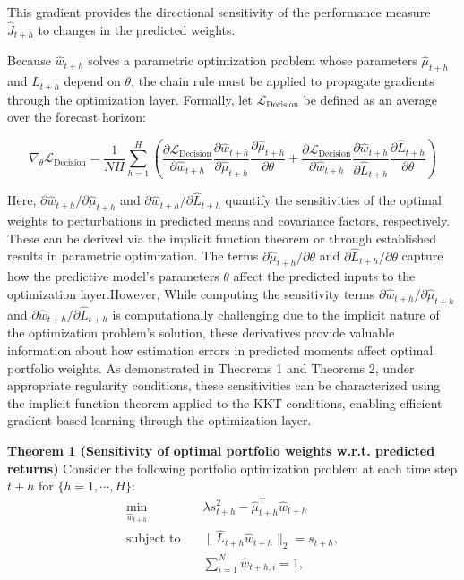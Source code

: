 This gradient provides the directional sensitivity of the performance measure $\hat{J}_{t+h}$ to changes in the predicted weights.

Because $\hat{w}_{t+h}$ solves a parametric optimization problem whose parameters $\hat{\mu}_{t+h}$ and $\hat{L}_{t+h}$ depend on $\theta$, the chain rule must be applied to propagate gradients through the optimization layer. Formally, let $\mathcal{L}_{\mathrm{Decision}}$ be defined as an average over the forecast horizon:

\begin{equation}
    \nabla_{\theta}\mathcal{L}_{\mathrm{Decision}} = \frac{1}{NH}\sum_{h=1}^{H} \left( \frac{\partial \mathcal{L}_{\mathrm{Decision}}}{\partial \hat{w}_{t+h}}\frac{\partial \hat{w}_{t+h}}{\partial \hat{\mu}_{t+h}}\frac{\partial \hat{\mu}_{t+h}}{\partial \theta} + \frac{\partial \mathcal{L}_{\mathrm{Decision}}}{\partial \hat{w}_{t+h}}\frac{\partial \hat{w}_{t+h}}{\partial \hat{L}_{t+h}}\frac{\partial \hat{L}_{t+h}}{\partial \theta}\right)
\end{equation}

Here, $\partial \hat{w}_{t+h}/\partial \hat{\mu}_{t+h}$ and $\partial \hat{w}_{t+h}/\partial \hat{L}_{t+h}$ quantify the sensitivities of the optimal weights to perturbations in predicted means and covariance factors, respectively. These can be derived via the implicit function theorem or through established results in parametric optimization. The terms $\partial \hat{\mu}_{t+h}/\partial \theta$ and $\partial \hat{L}_{t+h}/\partial \theta$ capture how the predictive model’s parameters $\theta$ affect the predicted inputs to the optimization layer.However, While computing the sensitivity terms $\partial \hat{w}_{t+h}/\partial \hat{\mu}_{t+h}$ and $\partial \hat{w}_{t+h}/\partial \hat{L}_{t+h}$ is computationally challenging due to the implicit nature of the optimization problem's solution, these derivatives provide valuable information about how estimation errors in predicted moments affect optimal portfolio weights. As demonstrated in Theorems 1 and Theorems 2, under appropriate regularity conditions, these sensitivities can be characterized using the implicit function theorem applied to the KKT conditions, enabling efficient gradient-based learning through the optimization layer.

\textbf{Theorem 1 (Sensitivity of optimal portfolio weights w.r.t. predicted returns)} Consider the following portfolio optimization problem at each time step $ t+h $ for $\{h = {1, \cdots, H}\}$:
\begin{equation}
\begin{aligned}
\min_{\hat{w}_{t+h}} \quad & \lambda s_{t+h}^{2} - \hat{\mu}_{t+h}^{\top} \hat{w}_{t+h} \\
\text{subject to} \quad & \|\hat{L}_{t+h} \hat{w}_{t+h}\|_2 = s_{t+h}, \\
& \sum_{i=1}^{N} \hat{w}_{t+h,i} = 1,
\end{aligned}
\label{eq:modified_problem}
\end{equation}


